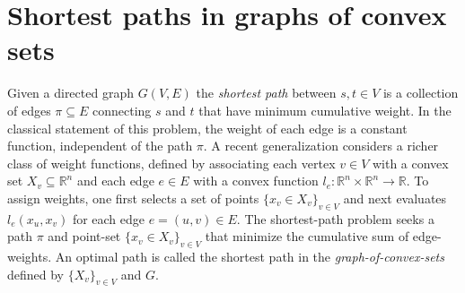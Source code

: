 \documentclass[letterpaper, 11pt]{article}
\begin{document}
%


\section{Shortest paths in graphs of convex sets}
Given a directed graph $G(V, E)$ the \emph{shortest path} between $s, t \in V$
is a collection of edges $\pi \subseteq E$ connecting $s$ and $t$ that have minimum cumulative weight.
In the classical statement of this problem, the weight
of each edge is a constant function, independent of the path $\pi$. 
A recent generalization considers a richer class of weight functions,
defined by associating each vertex $v \in V$ with a convex set $X_v \subseteq \mathbb{R}^n$ 
and each  edge $e \in E$ with a convex function 
$l_e : \mathbb{R}^n \times \mathbb{R}^n \rightarrow \mathbb{R}$.
To assign weights, one first selects a set of points $\{x_v \in X_v\}_{v \in V}$
and next evaluates $l_e(x_{u}, x_{v})$ for each edge $e = (u, v) \in E$.  The
shortest-path problem seeks a path $\pi$ and point-set $\{x_v \in X_v\}_{v \in
V}$ that minimize the cumulative sum of edge-weights.  An optimal path is
called the shortest path in the \emph{graph-of-convex-sets} defined by
$\{X_v\}_{v\in V}$ and $G$.
\end{document}
